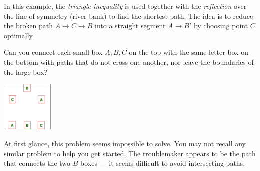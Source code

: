 \documentclass{article}
\begin{document}
\begin{remark*}
    In this example, the \emph{triangle inequality} is used together with the \emph{reflection} over the line of symmetry (river bank) to find the shortest path. The idea is to reduce the broken path \( A \to C \to B \) into a straight segment \( A \to B' \) by choosing point \( C \) optimally.
\end{remark*}


\begin{example}\label{example:box-topological-matching}
    Can you connect each small box \( A, B, C \) on the top with the same-letter box on the bottom with paths that do not cross one another, nor leave the boundaries of the large box?
      
\end{example}

\begin{center}
    \includegraphics[width=2.5cm]{./png/3-houses.png}
\end{center}

\begin{analysis*}
    At first glance, this problem seems impossible to solve. You may not recall any similar problem to help you get started. The troublemaker appears to be the path that connects the two \( B \) boxes — it seems difficult to avoid intersecting paths.
\end{analysis*}
\end{document}
